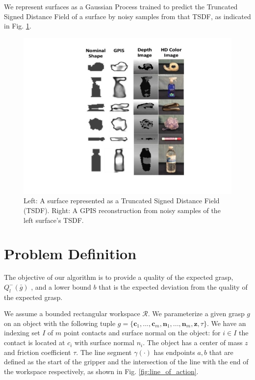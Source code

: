 \documentclass[letterpaper, 10 pt, conference]{ieeeconf}  %
\begin{document}
We represent surfaces as a Gaussian Process trained to predict the Truncated Signed Distance Field of a surface by noisy samples from that TSDF, as indicated in Fig.
 \ref{fig:GPIS_TSDF}.

\begin{figure}[ht!]
\centering
\includegraphics[scale = 0.3]{figures/Slide3.jpg}
\caption{Left: A surface represented as a Truncated Signed Distance Field (TSDF).
Right: A GPIS reconstruction from noisy samples of the left surface's TSDF.}
\vspace*{-10pt}
\label{fig:GPIS_TSDF}
\end{figure}

\section{Problem Definition}

The objective of our algorithm is to provide a quality of the expected grasp, $Q_l^-(\bar{g})$ \cite{ferrari1992}, and a lower bound $b$ that is the expected deviation from the quality of the expected grasp. 

We assume a bounded rectangular workspace $\mathcal{R}$.
We parameterize a given grasp $g$ on an object with the following tuple $g = \lbrace \textbf{c}_1,...,\textbf{c}_m,\textbf{n}_1,...,\textbf{n}_m,\textbf{z},\tau\rbrace$.
We have an indexing set $I$ of $m$ point contacts and surface normal on the object: for $i \in I$ the contact is located at $c_i$ with surface normal $n_i$.
The object has a center of mass $z$ and friction coefficient $\tau$.
The line segment $\gamma(\cdot)$ has endpoints $a,b$ that are defined as the start of the gripper and the intersection of the line with the end of the workspace respectively, as shown in Fig. 
 \ref{fig:line_of_action}.
\end{document}

